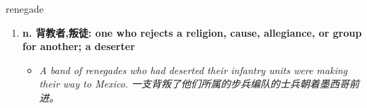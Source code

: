 
\begin{frame}
{\huge renegade}
\begin{center}
\begin{enumerate}\Large
  \item \textbf{n. 背教者,叛徒: one who rejects a religion, cause, allegiance, or group for another; a deserter}
  \begin{itemize}
    \item \em{\Large{A band of renegades who had deserted their infantry units were making their way to Mexico. 一支背叛了他们所属的步兵编队的士兵朝着墨西哥前进。}}
  \end{itemize}
\end{enumerate}
\end{center}
\end{frame}
